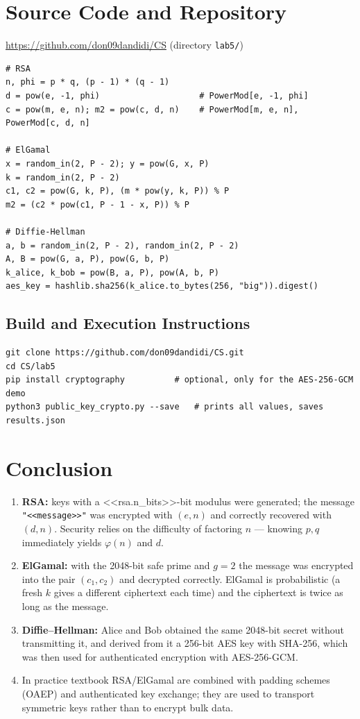 \documentclass[12pt,a4paper]{article}
\begin{document}
\section{Source Code and Repository}
\begin{center}
\url{https://github.com/don09dandidi/CS} \quad (directory \texttt{lab5/})
\end{center}
\begin{lstlisting}[style=py, caption={Core of the three tasks (excerpt from \texttt{public\_key\_crypto.py})}]
# RSA
n, phi = p * q, (p - 1) * (q - 1)
d = pow(e, -1, phi)                    # PowerMod[e, -1, phi]
c = pow(m, e, n); m2 = pow(c, d, n)    # PowerMod[m, e, n], PowerMod[c, d, n]

# ElGamal
x = random_in(2, P - 2); y = pow(G, x, P)
k = random_in(2, P - 2)
c1, c2 = pow(G, k, P), (m * pow(y, k, P)) % P
m2 = (c2 * pow(c1, P - 1 - x, P)) % P

# Diffie-Hellman
a, b = random_in(2, P - 2), random_in(2, P - 2)
A, B = pow(G, a, P), pow(G, b, P)
k_alice, k_bob = pow(B, a, P), pow(A, b, P)
aes_key = hashlib.sha256(k_alice.to_bytes(256, "big")).digest()
\end{lstlisting}

\subsection{Build and Execution Instructions}
\begin{lstlisting}[style=sh]
git clone https://github.com/don09dandidi/CS.git
cd CS/lab5
pip install cryptography          # optional, only for the AES-256-GCM demo
python3 public_key_crypto.py --save   # prints all values, saves results.json
\end{lstlisting}

\section{Conclusion}
\begin{enumerate}
  \item \textbf{RSA:} keys with a <<rsa.n_bits>>-bit modulus were generated; the message
        \texttt{"<<message>>"} was encrypted with $(e,n)$ and correctly recovered with $(d,n)$.
        Security relies on the difficulty of factoring $n$ — knowing $p,q$ immediately yields
        $\varphi(n)$ and $d$.
  \item \textbf{ElGamal:} with the 2048-bit safe prime and $g=2$ the message was encrypted into the
        pair $(c_1,c_2)$ and decrypted correctly. ElGamal is probabilistic (a fresh $k$ gives a
        different ciphertext each time) and the ciphertext is twice as long as the message.
  \item \textbf{Diffie–Hellman:} Alice and Bob obtained the same 2048-bit secret without
        transmitting it, and derived from it a 256-bit AES key with SHA-256, which was then used
        for authenticated encryption with AES-256-GCM.
  \item In practice textbook RSA/ElGamal are combined with padding schemes (OAEP) and authenticated
        key exchange; they are used to transport symmetric keys rather than to encrypt bulk data.
\end{enumerate}
\end{document}
